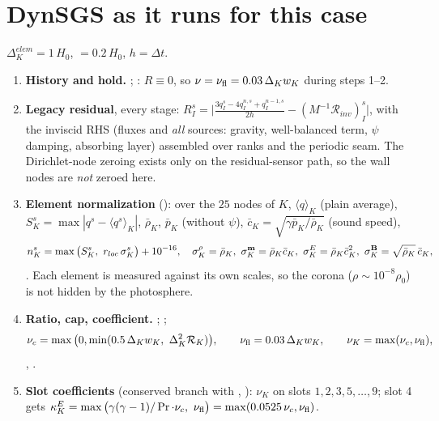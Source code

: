 \documentclass[10pt]{article}
\begin{document}
\section{DynSGS as it runs for this case}
$\Delta^{elem}_K=1\,H_0$,  $=0.2\,H_0$, $h=\Delta t$.
\begin{enumerate}[leftmargin=*]
\item \textbf{History and hold.} ; : $R\equiv0$, so
$\nu=\nu_{\mathrm{fl}}=0.03\,\Delta_Kw_K$ during steps 1--2.
\item \textbf{Legacy residual}, every stage:
$R^s_I=\big|\tfrac{3q^s_I-4q^{n,s}_I+q^{n-1,s}_I}{2h}-(M^{-1}\mathcal R_{inv})^s_I\big|$, with the inviscid RHS
(fluxes and \emph{all} sources: gravity, well-balanced term, $\psi$ damping, absorbing layer) assembled over
ranks and the periodic seam. The Dirichlet-node zeroing exists only on the residual-sensor path, so the
wall nodes are \emph{not} zeroed here.
\item \textbf{Element normalization} (): over the $25$ nodes of $K$,
$\langle q\rangle_K$ (plain average), $S^s_K=\max|q^s-\langle q^s\rangle_K|$,
$\bar\rho_K$, $\bar p_K$ (without $\psi$), $\bar c_K=\sqrt{\gamma\bar p_K/\bar\rho_K}$ (sound speed),
\[
n^s_K=\max\big(S^s_K,\ r_{loc}\,\sigma^s_K\big)+10^{-16},\quad
\sigma^\rho_K=\bar\rho_K,\ \sigma^{\bmom}_K=\bar\rho_K\bar c_K,\ \sigma^E_K=\bar\rho_K\bar c_K^2,\ \sigma^{\bB}_K=\sqrt{\bar\rho_K}\,\bar c_K,
\]
. Each element is measured against its own scales, so the corona ($\rho\sim10^{-8}\rho_0$) is
not hidden by the photosphere.
\item \textbf{Ratio, cap, coefficient.} ;
;
\[
\nuc=\max\big(0,\min(0.5\,\Delta_Kw_K,\ \Delta_K^2\mathcal R_K)\big),\qquad
\nufl=0.03\,\Delta_Kw_K,\qquad \nu_K=\max(\nuc,\nufl),
\]
, .
\item \textbf{Slot coefficients} (conserved branch with , ):
$\nu_K$ on slots $1,2,3,5,\dots,9$; slot 4 gets $\kappa^E_K=\max\big(\gamma(\gamma-1)/\Pr\cdot\nuc,\ \nufl\big)=\max(0.0525\,\nuc,\nufl)$.
\end{enumerate}
\end{document}
